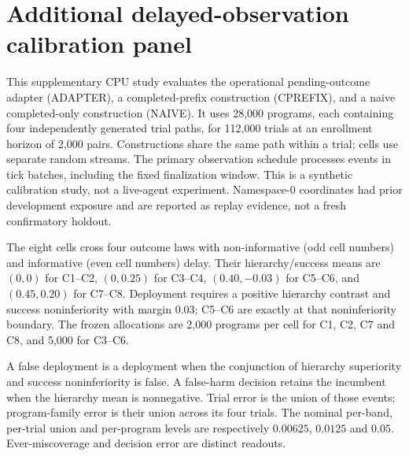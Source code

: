 \section{Additional delayed-observation calibration panel}
\label{app:t1_validation}
This supplementary CPU study evaluates the operational pending-outcome adapter
(ADAPTER), a completed-prefix construction (CPREFIX), and a naive completed-only
construction (NAIVE). It uses 28,000 programs, each containing four independently
generated trial paths, for 112,000 trials at an enrollment horizon of 2,000 pairs.
Constructions share the same path within a trial; cells use separate random streams.
The primary observation schedule processes events in tick batches, including the
fixed finalization window. This is a synthetic calibration study, not a live-agent
experiment. Namespace-0 coordinates had prior development exposure and are reported
as replay evidence, not a fresh confirmatory holdout.

The eight cells cross four outcome laws with non-informative (odd cell numbers)
and informative (even cell numbers) delay. Their hierarchy/success means are
$(0,0)$ for C1--C2, $(0,0.25)$ for C3--C4, $(0.40,-0.03)$ for C5--C6,
and $(0.45,0.20)$ for C7--C8. Deployment requires a positive hierarchy contrast
and success noninferiority with margin $0.03$; C5--C6 are exactly at that
noninferiority boundary. The frozen allocations are 2,000 programs per cell
for C1, C2, C7 and C8, and 5,000 for C3--C6.

A false deployment is a deployment when the conjunction of hierarchy superiority
and success noninferiority is false. A false-harm decision retains the incumbent
when the hierarchy mean is nonnegative. Trial error is the union of those events;
program-family error is their union across its four trials. The nominal per-band,
per-trial union and per-program levels are respectively $0.00625$, $0.0125$ and
$0.05$. Ever-miscoverage and decision error are distinct readouts.

